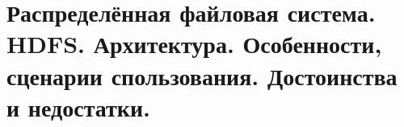 \section{Распределённая файловая система. HDFS. Архитектура. Особенности, сценарии спользования. Достоинства и недостатки.}
